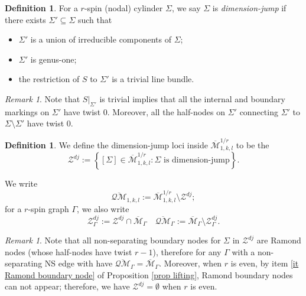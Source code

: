 \documentclass[11pt]{amsart}
\theoremstyle{definition}
\newtheorem{dfn}[dummy]{Definition}
\theoremstyle{remark}
\newtheorem{rmk}[dummy]{Remark}
\newcommand{\oQMb}{{\overline{\mathcal{QM}}}}
\newcommand{\<}{\left<}
\renewcommand{\>}{\right>}
\numberwithin{equation}{section}
\def\Mbar{{\overline{\mathcal M}}}
\begin{document}
\begin{dfn}
    For a $r$-spin (nodal) cylinder $\Sigma$, we say $\Sigma$ is \textit{dimension-jump} if there exists $\Sigma'\subseteq \Sigma$ such that
    \begin{itemize}
        \item $\Sigma'$ is a union of irreducible components of $\Sigma$;
        \item $\Sigma'$ is genus-one;
        \item the restriction of $S$ to $\Sigma'$ is a trivial line bundle.
    \end{itemize}
\end{dfn}
\begin{rmk}
    Note that $S\vert_{\Sigma'}$ is trivial implies that all the internal and boundary markings on $\Sigma'$ have twist $0$. Moreover, all the half-nodes on $\Sigma'$ connecting $\Sigma'$ to $\Sigma\setminus\Sigma'$ have twist $0$.
\end{rmk}

\begin{dfn}
    We define the dimension-jump loci inside $\Mbar^{1/r}_{1,k,l}$ to be the 
    \begin{equation*}
         \mathcal Z^{dj}:=\left\{[\Sigma]\in \Mbar^{1/r}_{1,k,l} \colon \Sigma \text{ is dimension-jump}\right\}.
    \end{equation*}

    We write 
    \begin{equation*}
        \oQMb_{1,k,l}:=\Mbar^{1/r}_{1,k,l}\setminus \mathcal Z^{dj};
    \end{equation*}
    for a $r$-spin graph $\Gamma$, we also write 
    \begin{equation*}
        \mathcal Z^{dj}_{\Gamma}:=\mathcal Z^{dj}\cap \Mbar_{\Gamma}\quad\oQMb_\Gamma:=\Mbar_\Gamma\setminus \mathcal Z^{dj}_{\Gamma}.
    \end{equation*}
\end{dfn}

\begin{rmk}\label{rmk dim jump non separating}
    Note that all non-separating boundary nodes for $\Sigma$ in $\mathcal Z^{dj}$ are Ramond nodes (whose half-nodes have twist $r-1$), therefore for any $\Gamma$ with a non-separating NS edge with have $\oQMb_{\Gamma}=\Mbar_{\Gamma}$.     
   Moreover, when $r$ is even, by item \ref{it Ramond boundary node} of Proposition \ref{prop lifting}, Ramond boundary nodes can not appear; therefore, we have $\mathcal Z^{dj}=\emptyset$ when $r$ is even.
\end{rmk}
\end{document}
